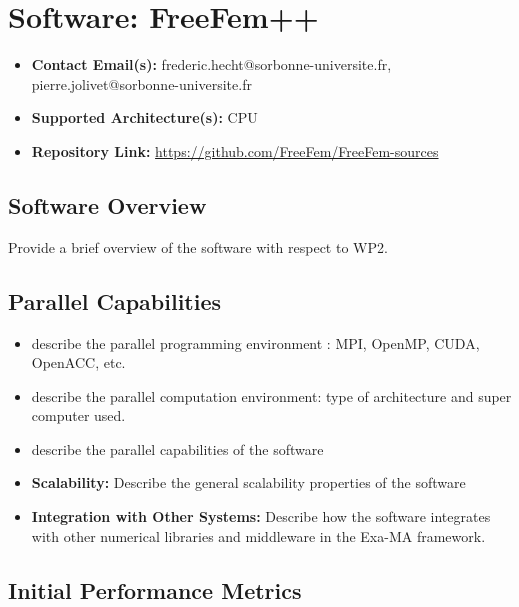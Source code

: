 \section{Software: FreeFem++}
\label{sec:WP2:FreeFem++:software}

\begin{itemize}
    \item \textbf{Contact Email(s):} frederic.hecht@sorbonne-universite.fr, pierre.jolivet@sorbonne-universite.fr
    \item \textbf{Supported Architecture(s):} CPU
    \item \textbf{Repository Link:} \href{https://github.com/FreeFem/FreeFem-sources}{https://github.com/FreeFem/FreeFem-sources}
\end{itemize}

\subsection{Software Overview}
\label{sec:WP2:FreeFem++:summary}

Provide a brief overview of the software with respect to WP2.

\subsection{Parallel Capabilities}
\label{sec:WP2:FreeFem++:performances}


\begin{itemize}
    \item describe the parallel programming  environment : MPI, OpenMP, CUDA, OpenACC, etc.
    \item describe the parallel computation environment: type of architecture and super computer used.
    \item describe the parallel capabilities of the software
    \item \textbf{Scalability:} Describe the general scalability properties of the software
    \item \textbf{Integration with Other Systems:} Describe how the software integrates with other numerical libraries and middleware in the Exa-MA framework.
\end{itemize}

\subsection{Initial Performance Metrics}
\label{sec:WP2:FreeFem++:metrics}

